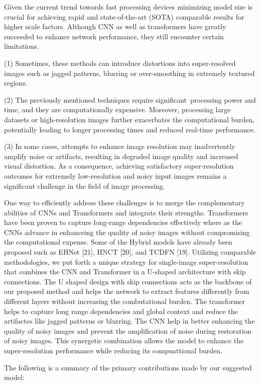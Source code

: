 \documentclass{ieeeaccess}
\begin{document}
Given the current trend towards fast processing devices minimizing model size is crucial for achieving rapid and state-of-the-art (SOTA) comparable results for higher scale factors. Although CNN as well as transformers have greatly succeeded to enhance network performance, they still encounter certain limitations.

(1) Sometimes, these methods can introduce distortions into super-resolved images such as jagged patterns, blurring or over-smoothing in extremely textured regions.

(2) The previously mentioned techniques require significant processing power and time, and they are computationally expensive. Moreover, processing large datasets or high-resolution images further exacerbates the computational burden, potentially leading to longer processing times and reduced real-time performance.

(3) In some cases, attempts to enhance image resolution may inadvertently amplify noise or artifacts, resulting in degraded image quality and increased visual distortion. As a consequence, achieving satisfactory super-resolution outcomes for extremely low-resolution and noisy input images remains a significant challenge in the field of image processing.

One way to efficiently address these challenges is to merge the complementary abilities of CNNs and Transformers and integrate their strengths. Transformers have been proven to capture long-range dependencies effectively where as the CNNs advance in enhanceing the quality of noisy images without compromising the computational expense. Some of the Hybrid models have already been proposed such as EHNet [21], HNCT [20], and TCDFN [19]. Utilizing comparable methodologies, we put forth a unique strategy for single-image super-resolution that combines the CNN and Transformer in a U-shaped architecture with skip connections. The U shaped design with skip connections acts as the backbone of our proposed method and helps the network to extract features differently from different layers without increasing the combutational burden. The transformer helps to capture long range dependencies and global context and reduce the artifactes like jagged patterns or blurring. The CNN help in better enhancing the quality of noisy images and prevent the amplification of noise during restoration of noisy images. This synergetic combination allows the model to enhance the super-resolution performance while reducing its compuattional burden.

The following is a summary of the primary contributions made by our suggested model:
\end{document}

